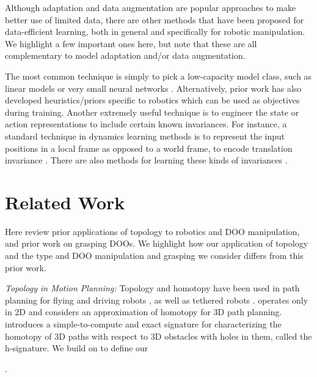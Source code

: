  Although adaptation and data augmentation are popular approaches to make better use of limited data, there are other methods that have been proposed for data-efficient learning, both in general and specifically for robotic manipulation. We highlight a few important ones here, but note that these are all complementary to model adaptation and/or data augmentation.

The most common technique is simply to pick a low-capacity model class, such as linear models or very small neural networks \cite{LinearAlarcon2013,TAMPC2021}. Alternatively, prior work has also developed heuristics/priors specific to robotics \cite{RoboticPriors2015} which can be used as objectives during training. Another extremely useful technique is to engineer the state or action representations to include certain known invariances. For instance, a standard technique in dynamics learning methods is to represent the input positions in a local frame as opposed to a world frame, to encode translation invariance \cite{Propnet,EquivariantTransporter2022,ZhuEquivariant2022}. There are also methods for learning these kinds of invariances \cite{TAMPC2021}.


\section{Related Work}
\label{Proposed:sec:related_work}

Here review prior applications of topology to robotics and DOO manipulation, and prior work on grasping DOOs. We highlight how our application of topology and the type and DOO manipulation and grasping we consider differs from this prior work.

\textit{Topology in Motion Planning:}
Topology and homotopy have been used in path planning for flying and driving robots \cite{Bhattacharya11,Bhattacharya12}, as well as tethered robots \cite{TetherHomotopy}. \cite{TetherHomotopy} operates only in 2D and \cite{PDR_Jaillet} considers an approximation of homotopy for 3D path planning. \cite{Bhattacharya11} introduces a simple-to-compute and exact signature for characterizing the homotopy of 3D paths with respect to 3D obstacles with holes in them, called the h-signature. We build on \cite{Bhattacharya11} to define our \signature{}.

